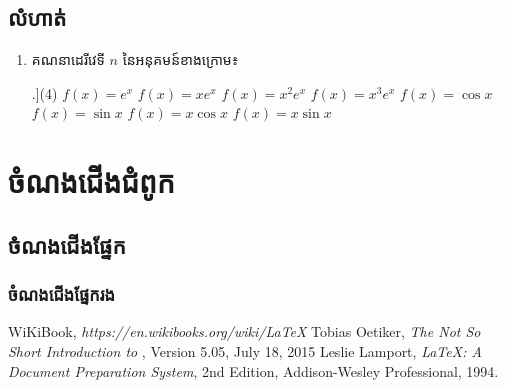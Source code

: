 \documentclass[12pt,a4paper]{book}
\begin{document}
\section*{លំហាត់}
\begin{enumerate}
	\item គណនាដេរីវេទី $ n $ នៃអនុគមន៍ខាងក្រោម៖
	\begin{tasks}[counter-format=tsk[k].](4)
		\task $ f(x)=e^x $
		\task $ f(x)=x e^x $
		\task $ f(x)=x^2 e^x $
		\task $ f(x)=x^3 e^x $
		\task $ f(x)=\cos x $
		\task $ f(x)=\sin x $
		\task $ f(x)=x\cos x $
		\task $ f(x)=x\sin x $
	\end{tasks}
\end{enumerate}
\appendix
\chapter{ចំណងជើងជំពូក}
\section{ចំណងជើងផ្នែក}
\subsection{ចំណងជើងផ្នែករង}
\backmatter
\begin{thebibliography}{3}
	 WiKiBook, \emph{https://en.wikibooks.org/wiki/LaTeX}
	 Tobias Oetiker, \emph{The Not So Short Introduction to \LaTeXe}, Version 5.05, July 18, 2015
	 Leslie Lamport, \emph{\LaTeX: A Document Preparation System}, 2nd Edition, Addison-Wesley Professional, 1994.
\end{thebibliography}
\end{document}
